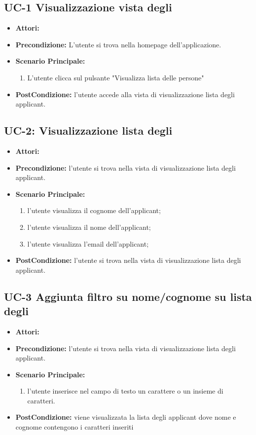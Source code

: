 \subsection{UC-1 Visualizzazione vista degli\applicant}
\begin{itemize}
	\item \textbf{Attori:}\loggedusr
	\item \textbf{Precondizione:} L'utente si trova nella homepage dell'applicazione.
	\item \textbf{Scenario Principale:}
		\begin{enumerate}
			\item L'utente clicca sul pulsante "Visualizza lista delle persone" 
		\end{enumerate}
	\item \textbf{PostCondizione:} l'utente accede alla vista di visualizzazione lista degli applicant.
\end{itemize}

\subsection{UC-2: Visualizzazione lista degli\applicant}
\begin{itemize}
	\item \textbf{Attori:}\loggedusr
	\item \textbf{Precondizione:} l'utente si trova nella vista di visualizzazione lista degli applicant.
	\item \textbf{Scenario Principale:} 
		\begin{enumerate}
			\item l'utente visualizza il cognome dell'applicant; 
			\item l'utente visualizza il nome dell'applicant;
			\item l'utente visualizza l'email dell'applicant;
		\end{enumerate}
	\item \textbf{PostCondizione:} l'utente si trova nella vista di visualizzazione lista degli applicant.
\end{itemize}

\subsection{UC-3 Aggiunta filtro su nome/cognome su lista degli\applicant}
\begin{itemize}
	\item \textbf{Attori:}\loggedusr
	\item \textbf{Precondizione:} l'utente si trova nella vista di visualizzazione lista degli applicant.
	\item \textbf{Scenario Principale:}
		\begin{enumerate}
			\item l'utente inserisce nel campo di testo un carattere o un insieme di caratteri.
		\end{enumerate}
	\item \textbf{PostCondizione:} viene visualizzata la lista degli applicant dove nome e cognome contengono i caratteri inseriti
\end{itemize}

